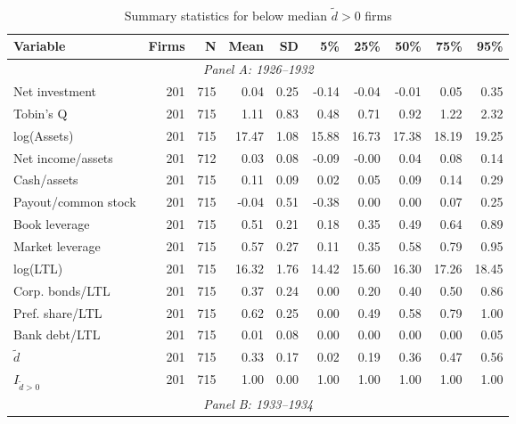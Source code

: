 \begin{table}[p]\centering
\caption{\\ Summary statistics for below median $\tilde{d} > 0$ firms}
\scriptsize
\label{tabapp:summary_I_smalld}
    \begin{threeparttable}
        \begin{tabular}{lrrrrrrrrr}
            \toprule
            Variable & Firms & N & Mean & SD & 5\% & 25\% & 50\% & 75\% & 95\% \\
            \midrule
            \multicolumn{10}{c}{\textit{Panel A: 1926--1932}} \\
            \midrule
            Net investment & 201 & 715 & 0.04 & 0.25 & -0.14 & -0.04 & -0.01 & 0.05 & 0.35 \\
            Tobin's Q & 201 & 715 & 1.11 & 0.83 & 0.48 & 0.71 & 0.92 & 1.22 & 2.32 \\
            log(Assets) & 201 & 715 & 17.47 & 1.08 & 15.88 & 16.73 & 17.38 & 18.19 & 19.25 \\
            Net income/assets & 201 & 712 & 0.03 & 0.08 & -0.09 & -0.00 & 0.04 & 0.08 & 0.14 \\
            Cash/assets & 201 & 715 & 0.11 & 0.09 & 0.02 & 0.05 & 0.09 & 0.14 & 0.29 \\
            Payout/common stock & 201 & 715 & -0.04 & 0.51 & -0.38 & 0.00 & 0.00 & 0.07 & 0.25 \\
            Book leverage & 201 & 715 & 0.51 & 0.21 & 0.18 & 0.35 & 0.49 & 0.64 & 0.89 \\
            Market leverage & 201 & 715 & 0.57 & 0.27 & 0.11 & 0.35 & 0.58 & 0.79 & 0.95 \\
            log(LTL) & 201 & 715 & 16.32 & 1.76 & 14.42 & 15.60 & 16.30 & 17.26 & 18.45 \\
            Corp. bonds/LTL & 201 & 715 & 0.37 & 0.24 & 0.00 & 0.20 & 0.40 & 0.50 & 0.86 \\
            Pref. share/LTL & 201 & 715 & 0.62 & 0.25 & 0.00 & 0.49 & 0.58 & 0.79 & 1.00 \\
            Bank debt/LTL & 201 & 715 & 0.01 & 0.08 & 0.00 & 0.00 & 0.00 & 0.00 & 0.05 \\
            \ensuremath{\tilde{d}} & 201 & 715 & 0.33 & 0.17 & 0.02 & 0.19 & 0.36 & 0.47 & 0.56 \\
            \ensuremath{I_{\tilde{d}>0}} & 201 & 715 & 1.00 & 0.00 & 1.00 & 1.00 & 1.00 & 1.00 & 1.00 \\
            \midrule
            \multicolumn{10}{c}{\textit{Panel B: 1933--1934}} \\

\end{tabular}
\end{threeparttable}
\end{table}
